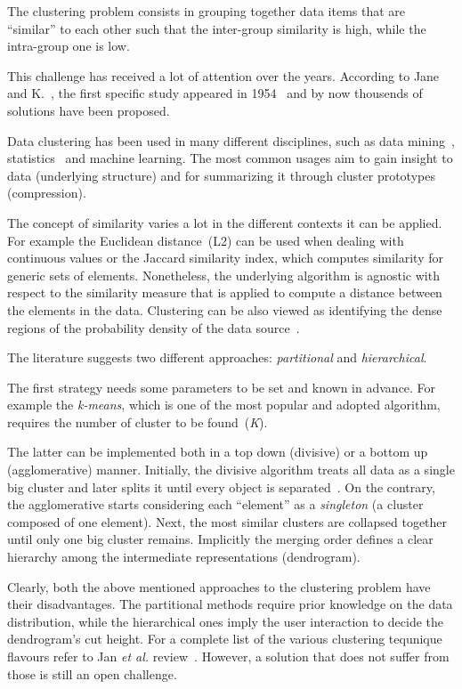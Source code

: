 \label{intro}
The clustering problem consists in grouping together data items that are ``similar'' to each other such that the inter-group similarity is high, while the intra-group one is low.

This challenge has received a lot of attention over the years.
According to Jane and K.~\cite{jain2010data}, the first specific study appeared in 1954~\cite{10.2307/2342679} and by now thousends of solutions have been proposed.

Data clustering has been used in many different disciplines, such as
data mining~\cite{fayyad1996advances}, statistics~\cite{tijms1994stochastic,banfield1993model} and machine learning.
The most common usages aim to gain insight to data (underlying structure) and for summarizing it through cluster prototypes (compression).

The concept of similarity varies a lot in the different contexts it can be applied.
For example the Euclidean distance~(L2) can be used when dealing with continuous values or the Jaccard similarity index, which computes similarity for generic sets of elements.
Nonetheless, the underlying algorithm is agnostic with respect to the similarity measure that is applied to compute a distance between the elements in the data.
Clustering can be also viewed as identifying the dense regions of the probability density of the data source~\cite{bradley1998scaling}.

The literature suggests two different approaches: \emph{partitional} and \emph{hierarchical}.

The first strategy needs some parameters to be set and known in advance.
For example the \emph{k-means}, which is one of the most popular and adopted algorithm,
requires the number of cluster to be found~(\emph{K}).

The latter can be implemented both in a top down (divisive) or a bottom up (agglomerative) manner.
Initially, the divisive algorithm treats all data as a single big cluster and later splits it until every object is separated~\cite{kaufman2009finding}.
On the contrary, the agglomerative starts considering each ``element'' as a \emph{singleton} (a cluster composed of one element).
Next, the most similar clusters are collapsed together until only one big cluster remains.
Implicitly the merging order defines a clear hierarchy among the intermediate representations (dendrogram).

Clearly, both the above mentioned approaches to the clustering problem have their disadvantages.
The partitional methods require prior knowledge on the data distribution, while the hierarchical ones imply the user interaction to decide the dendrogram's cut height.
For a complete list of the various clustering tequnique flavours refer to Jan \emph{et al.} review~\cite{jain2010data}.
However, a solution that does not suffer from those is still an open challenge.

